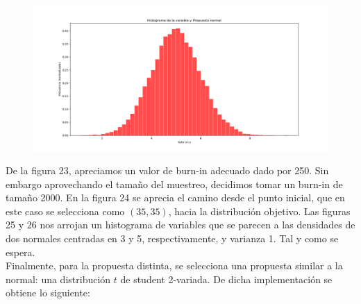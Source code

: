 \documentclass[letterpaper]{article}
\newcommand{\1}{\mathds{1}}
\theoremstyle{definition}
\theoremstyle{definition}
\theoremstyle{definition}
\theoremstyle{definition}
\theoremstyle{definition}
\begin{document}
    \begin{figure}[h!]
        \centering
        \includegraphics[width=\linewidth]{26.png}
        \caption{}
    \end{figure} 
    De la figura 23, apreciamos un valor de burn-in adecuado dado por 250. Sin embargo aprovechando el tamaño del muestreo, decidimos 
    tomar un burn-in de tamaño 2000. En la figura 24 se aprecia el camino desde el punto inicial, que en este caso se selecciona como $(35,35)$, hacia 
    la distribución objetivo. Las figuras 25 y 26 nos arrojan un histograma de variables que se parecen a las 
    densidades de dos normales centradas en 3 y 5, respectivamente, y varianza 1. Tal y como se espera.\\

    Finalmente, para la propuesta distinta, se selecciona una propuesta similar a la normal: una distribución $t$ de student 2-variada. De dicha implementación se obtiene 
    lo siguiente:
\end{document}
